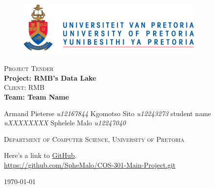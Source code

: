 \begin{titlepage}
	\begin{center}
		
		\begin{figure}[t]
			\centering
			\includegraphics[width=350px]{images/UP_Logo.png}
		\end{figure}
		
		\textsc{\large Project Tender} \\ 
		\vspace{2cm}
		\textbf{\Huge Project: RMB's Data Lake} \\ 
		\textsc{\large Client: RMB} \\ 
		\vspace{2cm}
		\textbf{\Huge Team: Team Name } \\ 
		
		\begin{flushright} \large
			Armand Pieterse \emph{u12167844} \newline
			Kgomotso Sito 		\emph{u12243273} \newline
			student name		\emph{uXXXXXXXX} \newline
			Sphelele Malo 	\emph{u12247040} \newline
			\end{flushright}
		\textsc{\small Department of Computer Science, University of Pretoria}
		
		\vfill
		
	Here's a link to \href{https://github.com/SpheMalo/COS-301-Main-Project.git}{GitHub}.\\
	\url{https://github.com/SpheMalo/COS-301-Main-Project.git}

	\vfill

	{\large \today}		
		
		
	\end{center}
\end{titlepage}
